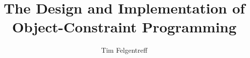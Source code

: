 \documentclass[phd,en,final,garamond,print]{swathesis}
\author{Tim Felgentreff}
\title{The Design and Implementation of Object-Constraint Programming}
\begin{document}
\frontmatter
\begin{otherlanguage}{ngerman}
\maketitle
\end{otherlanguage}

\mainmatter


\sloppy
\printbibliography
\fussy
\appendix

\backmatter
\end{document}
